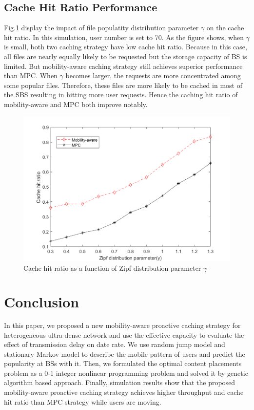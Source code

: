\documentclass[conference]{IEEEtran}
\begin{document}
\subsection{Cache Hit Ratio Performance}
Fig.\ref{fig 5} display the impact of file populatity distribution parameter $\gamma$ on the cache hit ratio. In this simulation, user number is set to 70. As the figure shows, when $\gamma$is small, both two caching strategy have low cache hit ratio. Because in this case, all files are nearly equally likely to be requested but the storage capacity of BS is limited. But mobility-aware caching strategy still achieves superior performance than MPC. When $\gamma$ becomes larger, the requests are more concentrated among some popular files. Therefore, these files are more likely to be cached in most of the SBS resulting in hitting more user requests. Hence the caching hit ratio of mobility-aware and MPC both improve notably.
\begin{figure}[htbp]
 \centerline{\includegraphics[scale=0.3]{fig5.png}}
 \caption{Cache hit ratio as a function of Zipf distribution parameter $\gamma$ }
 \label{fig 5}
\end{figure}
\section{Conclusion}

In this paper, we proposed a new mobility-aware proactive caching strategy for heterogeneous ultra-dense network and use the effective capacity to evaluate the effect of transmission delay on date rate. We use random jump model and stationary Markov model to describe the mobile pattern of users and predict the popularity at BSs with it. Then, we formulated the optimal content placements problem as a 0-1 integer nonlinear programming problem and solved it by genetic algorithm based approach. Finally, simulation results show that the proposed mobility-aware proactive caching strategy achieves higher throughput and cache hit ratio than MPC strategy while users are moving.


\end{document}
